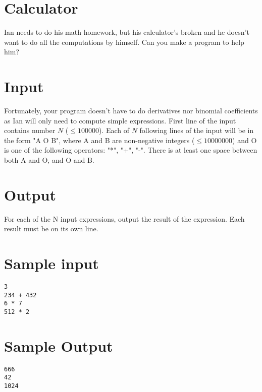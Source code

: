\documentclass{article}
\begin{document}
\section*{\fontsize{12}{25}Calculator}
Ian needs to do his math homework, but his calculator's broken and he doesn't want to do all the computations by himself. Can you make a program to help him?

\section*{Input}

Fortunately, your program doesn't have to do derivatives nor binomial coefficients as Ian will only need to compute simple expressions. First line of the input contains number $N$ ($\leq 100000$). Each of $N$ following lines of the input will be in the form "A O B", where A and B are non-negative integers ($\leq 10000000$) and O is one of the following operators: "*", "+", "-". There is at least one space between both A and O, and O and B.

\section*{Output}

For each of the N input expressions, output the result of the expression. Each result must be on its own line.

\section*{Sample input}
\begin{verbatim}
3
234 + 432
6 * 7
512 * 2
\end{verbatim}

\section*{Sample Output}
\begin{verbatim}
666
42
1024
\end{verbatim}
\end{document}

